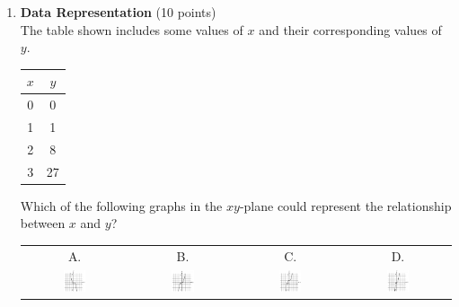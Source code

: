\begin{enumerate}
  \item \textbf{Data Representation} (10 points)\\
  The table shown includes some values of $x$ and their corresponding values of $y$.
  \begin{center}
    \begin{tabular}{|c|c|}
      \hline
      $x$ & $y$ \\
      \hline
      0 & 0 \\
      \hline
      1 & 1 \\
      \hline
      2 & 8 \\
      \hline
      3 & 27 \\
      \hline
    \end{tabular}
  \end{center}
  Which of the following graphs in the $xy$-plane could represent the relationship between $x$ and $y$?
  \begin{center}
    \begin{tabular}{cccc}
      A. & B. & C. & D. \\
      \includegraphics[width=0.23\textwidth]{images/2025_06_15_5ccb8dd1752fe76599e7g-025(2)} &
      \includegraphics[width=0.23\textwidth]{images/2025_06_15_5ccb8dd1752fe76599e7g-025} &
      \includegraphics[width=0.23\textwidth]{images/2025_06_15_5ccb8dd1752fe76599e7g-025(3)} &
      \includegraphics[width=0.23\textwidth]{images/2025_06_15_5ccb8dd1752fe76599e7g-025(1)} \\
    \end{tabular}
  \end{center}
  \begin{subanswer}
  \end{subanswer}


\end{enumerate}
